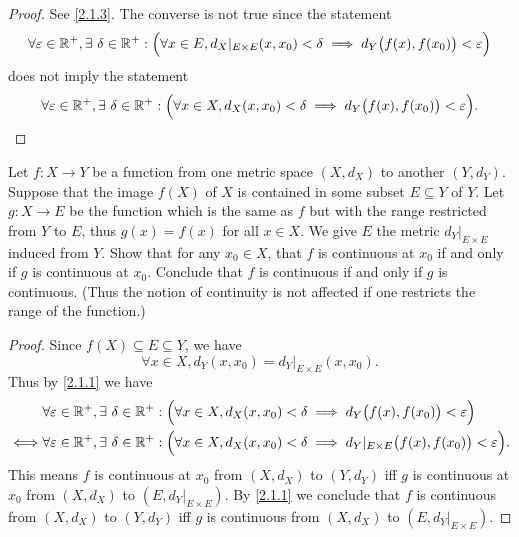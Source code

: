 \begin{proof}
  See \cref{2.1.3}.
  The converse is not true since the statement
  \[
    \forall \varepsilon \in \mathbb{R}^+, \exists\ \delta \in \mathbb{R}^+ : \Big(\forall x \in E, d_X|_{E \times E}(x, x_0) < \delta \implies d_Y\big(f(x), f(x_0)\big) < \varepsilon\Big)
  \]
  does not imply the statement
  \[
    \forall \varepsilon \in \mathbb{R}^+, \exists\ \delta \in \mathbb{R}^+ : \Big(\forall x \in X, d_X(x, x_0) < \delta \implies d_Y\big(f(x), f(x_0)\big) < \varepsilon\Big).
  \]
\end{proof}

\begin{ex}\label{ex:2.1.7}
  Let \(f : X \to Y\) be a function from one metric space \((X, d_X)\) to another \((Y, d_Y)\).
  Suppose that the image \(f(X)\) of \(X\) is contained in some subset \(E \subseteq Y\) of \(Y\).
  Let \(g : X \to E\) be the function which is the same as \(f\) but with the range restricted from \(Y\) to \(E\), thus \(g(x) = f(x)\) for all \(x \in X\).
  We give \(E\) the metric \(d_Y|_{E \times E}\) induced from \(Y\).
  Show that for any \(x_0 \in X\), that \(f\) is continuous at \(x_0\) if and only if \(g\) is continuous at \(x_0\).
  Conclude that \(f\) is continuous if and only if \(g\) is continuous.
  (Thus the notion of continuity is not affected if one restricts the range of the function.)
\end{ex}

\begin{proof}
  Since \(f(X) \subseteq E \subseteq Y\), we have
  \[
    \forall x \in X, d_Y(x, x_0) = d_Y|_{E \times E}(x, x_0).
  \]
  Thus by \cref{2.1.1} we have
  \begin{align*}
         & \forall \varepsilon \in \mathbb{R}^+, \exists\ \delta \in \mathbb{R}^+ : \Big(\forall x \in X, d_X(x, x_0) < \delta \implies d_Y\big(f(x), f(x_0)\big) < \varepsilon\Big)                \\
    \iff & \forall \varepsilon \in \mathbb{R}^+, \exists\ \delta \in \mathbb{R}^+ : \Big(\forall x \in X, d_X(x, x_0) < \delta \implies d_Y|_{E \times E}\big(f(x), f(x_0)\big) < \varepsilon\Big).
  \end{align*}
  This means \(f\) is continuous at \(x_0\) from \((X, d_X)\) to \((Y, d_Y)\) iff \(g\) is continuous at \(x_0\) from \((X, d_X)\) to \((E, d_Y|_{E \times E})\).
  By \cref{2.1.1} we conclude that \(f\) is continuous from \((X, d_X)\) to \((Y, d_Y)\) iff \(g\) is continuous from \((X, d_X)\) to \((E, d_Y|_{E \times E})\).
\end{proof}